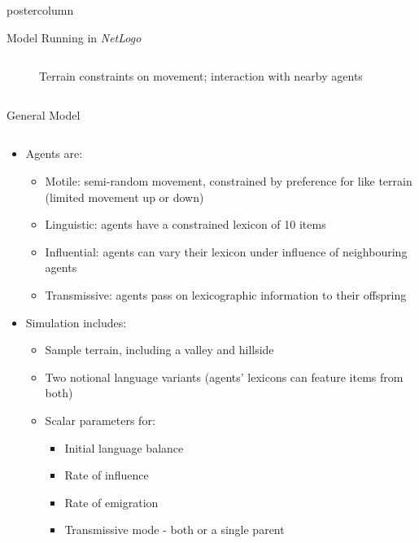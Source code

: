 \documentclass[final,hyperref={pdfpagelabels=false}]{beamer}
\begin{document}
\begin{frame}
\begin{columns}[T]
\begin{column}{.33\textwidth}
\begin{beamercolorbox}[center,wd=\textwidth]{postercolumn}
\begin{minipage}[T]{.95\textwidth}
{\begin{block}{Model Running in \textit{NetLogo}}
\begin{columns}[T]
\begin{column}{.32\textwidth}
\begin{figure}[h!]
                      \caption{Terrain constraints on movement; interaction with nearby agents}
                    \end{figure}
                  \end{column}
                \end{columns}
            \end{block}
            \vfill
            \begin{block}{General Model}
              \begin{columns}
                \begin{column}{.99\textwidth}
                  \begin{itemize}
                    \item Agents are:
                      \begin{itemize}
                        \item Motile: semi-random movement, constrained by preference for like terrain (limited movement up or down)
                        \item Linguistic: agents have a constrained lexicon of 10 items
                        \item Influential: agents can vary their lexicon under influence of neighbouring agents
                        \item Transmissive: agents pass on lexicographic information to their offspring
                      \end{itemize}
                    \item Simulation includes:
                      \begin{itemize}
                        \item Sample terrain, including a valley and hillside
                        \item Two notional language variants (agents' lexicons can feature items from both)
                        \item Scalar parameters for:
                          \begin{itemize}
                            \item Initial language balance
                            \item Rate of influence
                            \item Rate of emigration
                            \item Transmissive mode - both or a single parent
                          \end{itemize}

\end{itemize}
\end{itemize}
\end{column}
\end{columns}
\end{block}}
\end{minipage}
\end{beamercolorbox}
\end{column}
\end{columns}
\end{frame}
\end{document}
